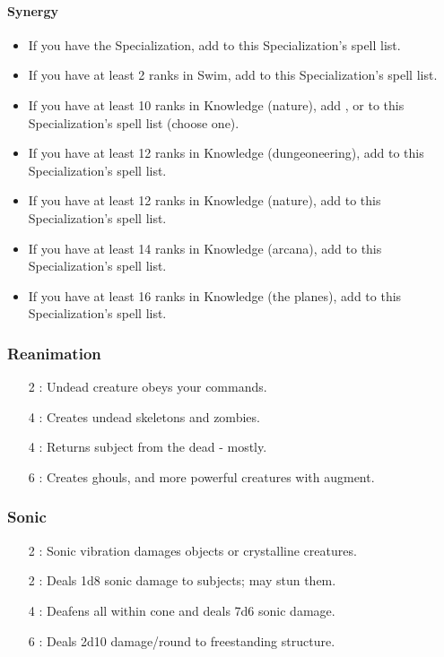 \paragraph{Synergy}
\begin{itemize}
 \item If you have the  Specialization, add  to this Specialization's spell list.
 \item If you have at least 2 ranks in Swim, add  to this Specialization's spell list.
 \item If you have at least 10 ranks in Knowledge (nature), add ,  or  to this Specialization's spell list (choose one).
 \item If you have at least 12 ranks in Knowledge (dungeoneering), add  to this Specialization's spell list.
 \item If you have at least 12 ranks in Knowledge (nature), add  to this Specialization's spell list.
 \item If you have at least 14 ranks in Knowledge (arcana), add  to this Specialization's spell list.
 \item If you have at least 16 ranks in Knowledge (the planes), add  to this Specialization's spell list.
\end{itemize}

\subsubsection{Reanimation}
\begin{itemize}
 \item[2] : Undead creature obeys your commands. 
 \item[4] : Creates undead skeletons and zombies.
 \item[4] : Returns subject from the dead - mostly.
 \item[6] : Creates ghouls, and more powerful creatures with augment.
\end{itemize}

\subsubsection{Sonic}
\begin{itemize}
 \item[2] : Sonic vibration damages objects or crystalline creatures.
 \item[2] : Deals 1d8 sonic damage to subjects; may stun them.
 \item[4] : Deafens all within cone and deals 7d6 sonic damage.
 \item[6] : Deals 2d10 damage/round to freestanding structure.
\end{itemize}

